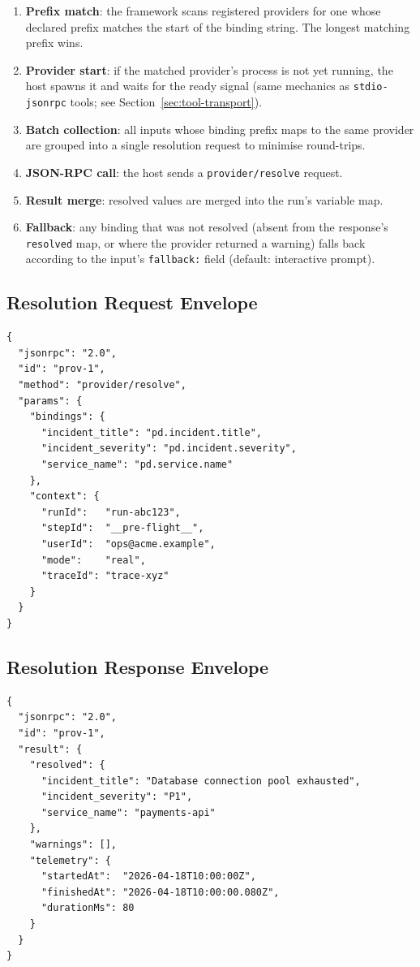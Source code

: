 \begin{enumerate}
  \item \textbf{Prefix match}: the framework scans registered providers for one
        whose declared prefix matches the start of the binding string.  The
        longest matching prefix wins.
  \item \textbf{Provider start}: if the matched provider's process is not yet
        running, the host spawns it and waits for the ready signal (same
        mechanics as \texttt{stdio-jsonrpc} tools; see
        Section~\ref{sec:tool-transport}).
  \item \textbf{Batch collection}: all inputs whose binding prefix maps to the
        same provider are grouped into a single resolution request to minimise
        round-trips.
  \item \textbf{JSON-RPC call}: the host sends a \texttt{provider/resolve}
        request.
  \item \textbf{Result merge}: resolved values are merged into the run's
        variable map.
  \item \textbf{Fallback}: any binding that was not resolved (absent from the
        response's \texttt{resolved} map, or where the provider returned a
        warning) falls back according to the input's \texttt{fallback:} field
        (default: interactive prompt).
\end{enumerate}

\subsection{Resolution Request Envelope}

\begin{verbatim}
{
  "jsonrpc": "2.0",
  "id": "prov-1",
  "method": "provider/resolve",
  "params": {
    "bindings": {
      "incident_title": "pd.incident.title",
      "incident_severity": "pd.incident.severity",
      "service_name": "pd.service.name"
    },
    "context": {
      "runId":   "run-abc123",
      "stepId":  "__pre-flight__",
      "userId":  "ops@acme.example",
      "mode":    "real",
      "traceId": "trace-xyz"
    }
  }
}
\end{verbatim}

\subsection{Resolution Response Envelope}

\begin{verbatim}
{
  "jsonrpc": "2.0",
  "id": "prov-1",
  "result": {
    "resolved": {
      "incident_title": "Database connection pool exhausted",
      "incident_severity": "P1",
      "service_name": "payments-api"
    },
    "warnings": [],
    "telemetry": {
      "startedAt":  "2026-04-18T10:00:00Z",
      "finishedAt": "2026-04-18T10:00:00.080Z",
      "durationMs": 80
    }
  }
}
\end{verbatim}

